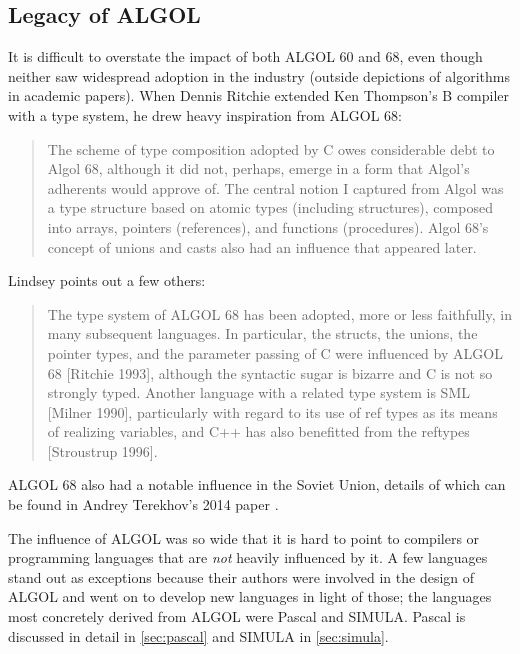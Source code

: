 
\subsection{Legacy of ALGOL}

It is difficult to overstate the impact of both ALGOL 60 and 68,
even though neither saw widespread adoption in the industry (outside depictions of
algorithms in academic papers).
When Dennis Ritchie extended Ken Thompson's B compiler with a type system, he drew heavy
inspiration from ALGOL 68:

\begin{quotation}
	The scheme of type composition adopted by C owes considerable debt to Algol 68,
	although it did not, perhaps, emerge in a form that Algol's adherents would
	approve of. The central notion I captured from Algol was a type structure based
	on atomic types (including structures), composed into arrays, pointers
	(references), and functions (procedures). Algol 68's concept of unions and
	casts also had an influence that appeared later.
	\cite{development_of_c_language_chist_ritchie_1996}
\end{quotation}

Lindsey points out a few others:

\begin{quotation}
	The type system of ALGOL 68 has been adopted, more or less faithfully, in many subsequent
	languages. In particular, the structs, the unions, the pointer types, and the parameter passing of C
	were influenced by ALGOL 68 [Ritchie 1993], although the syntactic sugar is bizarre and C is not so
	strongly typed. Another language with a related type system is SML [Milner 1990], particularly with
	regard to its use of ref types as its means of realizing variables, and C++ has also benefitted from the
	reftypes [Stroustrup 1996].
\end{quotation}

ALGOL 68 also had a notable influence in the Soviet Union, details of which can
be found in Andrey Terekhov's 2014 paper \citep{algol_68_ussr_2014}.


The influence of ALGOL was so wide that it is hard to point to compilers or programming
languages that are \textit{not} heavily influenced by it.
A few languages stand out as exceptions because their authors were involved in the
design of ALGOL and went on to develop new languages in light of those;
the languages most concretely derived from ALGOL were Pascal and SIMULA.
Pascal is discussed in detail in \cref{sec:pascal}
and SIMULA in \cref{sec:simula}.

